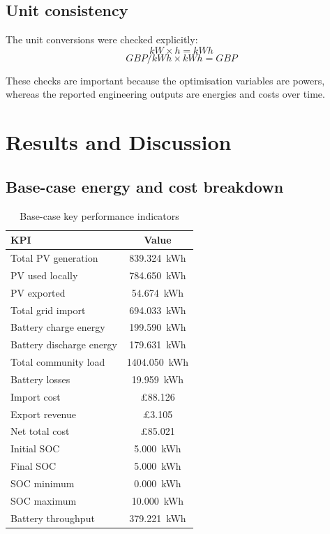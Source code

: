 \documentclass[12pt,a4paper]{article}
\begin{document}
\subsection{Unit consistency}

The unit conversions were checked explicitly:
\[
\si{kW} \times \si{h} = \si{kWh}
\]
\[
\si{GBP/kWh} \times \si{kWh} = \si{GBP}
\]

These checks are important because the optimisation variables are powers, whereas the reported engineering outputs are energies and costs over time.

\section{Results and Discussion}

\subsection{Base-case energy and cost breakdown}

\begin{table}[H]
\centering
\caption{Base-case key performance indicators}
\begin{tabular}{lc}
\toprule
KPI & Value \\
\midrule
Total PV generation & \SI{839.324}{kWh} \\
PV used locally & \SI{784.650}{kWh} \\
PV exported & \SI{54.674}{kWh} \\
Total grid import & \SI{694.033}{kWh} \\
Battery charge energy & \SI{199.590}{kWh} \\
Battery discharge energy & \SI{179.631}{kWh} \\
Total community load & \SI{1404.050}{kWh} \\
Battery losses & \SI{19.959}{kWh} \\
Import cost & \pounds 88.126 \\
Export revenue & \pounds 3.105 \\
Net total cost & \pounds 85.021 \\
Initial SOC & \SI{5.000}{kWh} \\
Final SOC & \SI{5.000}{kWh} \\
SOC minimum & \SI{0.000}{kWh} \\
SOC maximum & \SI{10.000}{kWh} \\
Battery throughput & \SI{379.221}{kWh} \\
\bottomrule
\end{tabular}
\end{table}
\end{document}
